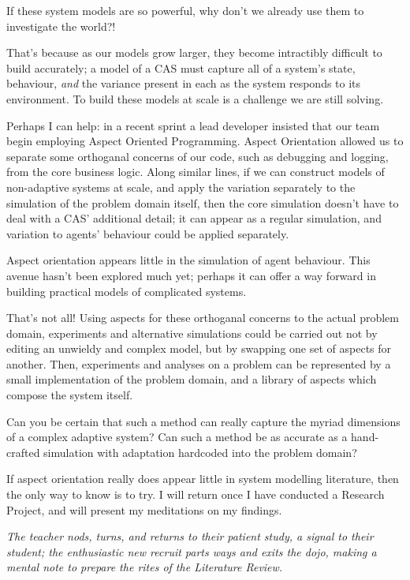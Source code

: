 \student If these system models are so powerful, why don't we already use them
to investigate the world?!

\teacher That's because as our models grow larger, they become intractibly
difficult to build accurately; a model of a CAS must capture all of a system's
state, behaviour, \emph{and} the variance present in each as the system responds
to its environment. To build these models at scale is a challenge we are still
solving.

\student Perhaps I can help: in a recent sprint a lead developer insisted that
our team begin employing Aspect Oriented Programming. Aspect Orientation allowed
us to separate some orthoganal concerns of our code, such as debugging and
logging, from the core business logic. Along similar lines, if we can construct
models of non-adaptive systems at scale, and apply the variation separately to
the simulation of the problem domain itself, then the core simulation doesn't
have to deal with a CAS' additional detail; it can appear as a regular
simulation, and variation to agents' behaviour could be applied separately.

\teacher Aspect orientation appears little in the simulation of agent behaviour.
This avenue hasn't been explored much yet; perhaps it can offer a way forward in
building practical models of complicated systems.

\student That's not all! Using aspects for these orthoganal concerns to the
actual problem domain, experiments and alternative simulations could be carried
out not by editing an unwieldy and complex model, but by swapping one set of
aspects for another. Then, experiments and analyses on a problem can be
represented by a small implementation of the problem domain, and a library of
aspects which compose the system itself.

\teacher Can you be certain that such a method can really capture the myriad
dimensions of a complex adaptive system? Can such a method be as accurate as a
hand-crafted simulation with adaptation hardcoded into the problem domain?

\student If aspect orientation really does appear little in system modelling
literature, then the only way to know is to try. I will return once I have
conducted a Research Project, and will present my meditations on my findings.

\indent \emph{The teacher nods, turns, and returns to their patient study, a
  signal to their student; the enthusiastic new recruit parts ways and exits the
  dojo, making a mental note to prepare the rites of the Literature Review.}




